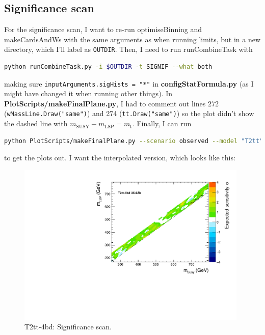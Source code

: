 \subsection{Significance scan}

For the significance scan, I want to re-run optimiseBinning and makeCardsAndWs with the same arguments as when running limits, but in a new directory, which I'll label as \texttt{OUTDIR}. Then, I need to run runCombineTask with

\begin{lstlisting}[belowskip=-0.7cm, language=sh, numbers=none]
python runCombineTask.py -i $OUTDIR -t SIGNIF --what both
\end{lstlisting}

making sure \texttt{inputArguments.sigHists = "*"} in \textbf{configStatFormula.py} (as I might have changed it when running other things). In \textbf{PlotScripts/makeFinalPlane.py}, I had to comment out lines 272 (\texttt{wMassLine.Draw("same")}) and 274 (\texttt{tt.Draw("same")}) so the plot didn't show the dashed line with $m_{\mathrm{SUSY}} - m_{\mathrm{LSP}} = m_{\mathrm{t}}$.  Finally, I can run

\begin{lstlisting}[belowskip=-0.7cm, language=sh, numbers=none]
python PlotScripts/makeFinalPlane.py --scenario observed --model "T2tt" -i $OUTDIR -o <output dir for plots> --mode pv --doubleTranspose --remake --remakePickle --smooth --task SIGNIF
\end{lstlisting}

to get the plots out. I want the interpolated version, which looks like this:

\begin{figure}[htbp]
\centering
\includegraphics[width=110mm]{./sec31/Significance_scan.pdf}
\caption{T2tt-4bd: Significance scan.}
\end{figure}

